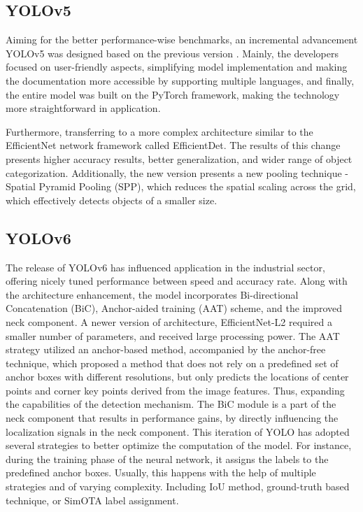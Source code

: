 \begin{multicols}{2}
\subsection{YOLOv5}
Aiming for the better performance-wise benchmarks, an incremental advancement YOLOv5 was designed based on the previous version \citep{Ultralytics2024}. Mainly, the developers focused on user-friendly aspects, simplifying model implementation and making the documentation more accessible by supporting multiple languages, and finally, the entire model was built on the PyTorch framework, making the technology more straightforward in application. 

Furthermore, transferring to a more complex architecture similar to the EfficientNet network framework called EfficientDet. The results of this change presents higher accuracy results, better generalization, and wider range of object categorization. Additionally, the new version presents a new pooling technique - Spatial Pyramid Pooling (SPP), which reduces the spatial scaling across the grid, which effectively detects objects of a smaller size. 


\subsection{YOLOv6}
The release of YOLOv6 has influenced application in the industrial sector, offering nicely tuned performance between speed and accuracy rate. Along with the architecture enhancement, the model incorporates Bi-directional Concatenation (BiC), Anchor-aided training (AAT) scheme, and the improved neck component. A newer version of architecture, EfficientNet-L2 required a smaller number of parameters, and received large processing power. The AAT strategy utilized an anchor-based method, accompanied by the anchor-free technique, which proposed a method that does not rely on a predefined set of anchor boxes with different resolutions, but only predicts the locations of center points and corner key points derived from the image features. Thus, expanding the capabilities of the detection mechanism. The BiC module is a part of the neck component that results in performance gains, by directly influencing the localization signals in the neck component. This iteration of YOLO has adopted several strategies to better optimize the computation of the model. For instance, during the training phase of the neural network, it assigns the labels to the predefined anchor boxes. Usually, this happens with the help of multiple strategies and of varying complexity. Including IoU method, ground-truth based technique, or SimOTA label assignment.


\end{multicols}
